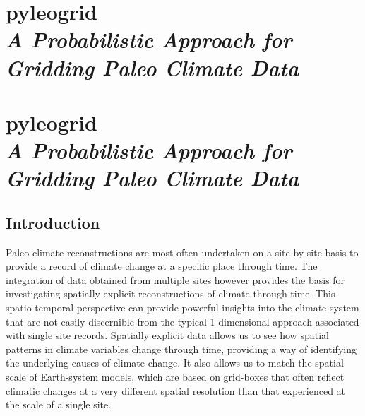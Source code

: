 \documentclass[
11pt, %
english, %
singlespacing, %
headsepline, %
]{MastersDoctoralThesis} %
\newcommand\Chapter[3][false]{
	\ifthenelse{\equal{#1}{false}} {%
		\chapter[#2: {\itshape#3}]{#2\\[2ex]\Large\itshape#3}
	}{%
		\chapter[#1]{#2\\[2ex]\Large\itshape#3}
	}
}
\begin{document}
\begin{NoHyper}

\Chapter{pyleogrid}{A Probabilistic Approach for Gridding Paleo Climate Data}

\label{chp:gridding}

\begin{refsection}


\section{Introduction}  \label{sec:gridding-intro}

Paleo-climate reconstructions are most often undertaken on a site by site basis to provide a record of climate change at a specific place through time. The integration of data obtained from multiple sites however provides the basis for investigating spatially explicit reconstructions of climate through time. This spatio-temporal perspective can provide powerful insights into the climate system that are not easily discernible from the typical 1-dimensional approach associated with single site records. Spatially explicit data allows us to see how spatial patterns in climate variables change through time, providing a way of identifying the underlying causes of climate change. It also allows us to match the spatial scale of Earth-system models, which are based on grid-boxes that often reflect climatic changes at a very different spatial resolution than that experienced at the scale of a single site.


\end{refsection}
\end{NoHyper}
\end{document}

